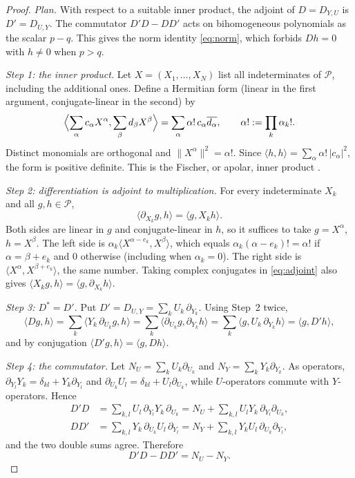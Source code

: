 \documentclass[11pt]{article}
\theoremstyle{remark}
\newcommand{\D}[2]{D_{#1,#2}}
\newcommand{\PP}{\mathcal P}
\begin{document}
\begin{proof}
\emph{Plan.} With respect to a suitable inner product, the adjoint of
$D=\D{Y}{U}$ is $D'=\D{U}{Y}$. The commutator $D'D-DD'$ acts on
bihomogeneous polynomials as the scalar $p-q$. This gives the norm identity
\eqref{eq:norm}, which forbids $Dh=0$ with $h\ne0$ when $p>q$.

\emph{Step 1: the inner product.} Let $X=(X_1,\dots,X_N)$ list all
indeterminates of $\PP$, including the additional ones. Define a Hermitian
form (linear in the first argument, conjugate-linear in the second) by
\begin{equation}\label{eq:fischer}
 \Bigl\langle\sum_\alpha c_\alpha X^\alpha,\sum_\beta d_\beta X^\beta
 \Bigr\rangle=\sum_\alpha\alpha!\,c_\alpha\overline{d_\alpha},
 \qquad\alpha!:=\prod_k\alpha_k!.
\end{equation}
Distinct monomials are orthogonal and $\|X^\alpha\|^2=\alpha!$. Since
$\langle h,h\rangle=\sum_\alpha\alpha!\,|c_\alpha|^2$, the form is positive
definite. This is the Fischer, or apolar, inner product
\cite[Section~2, equation~(8) and Proposition~3]{AldazRender}.

\emph{Step 2: differentiation is adjoint to multiplication.} For every
indeterminate $X_k$ and all $g,h\in\PP$,
\begin{equation}\label{eq:adjoint}
 \langle\partial_{X_k}g,h\rangle=\langle g,X_kh\rangle .
\end{equation}
Both sides are linear in $g$ and conjugate-linear in $h$, so it suffices to
take $g=X^\alpha$, $h=X^\beta$. The left side is
$\alpha_k\langle X^{\alpha-e_k},X^\beta\rangle$, which equals
$\alpha_k(\alpha-e_k)!=\alpha!$ if $\alpha=\beta+e_k$ and $0$ otherwise
(including when $\alpha_k=0$). The right side is
$\langle X^\alpha,X^{\beta+e_k}\rangle$, the same number. Taking complex
conjugates in \eqref{eq:adjoint} also gives
$\langle X_kg,h\rangle=\langle g,\partial_{X_k}h\rangle$.

\emph{Step 3: $D^*=D'$.} Put $D'=\D{U}{Y}=\sum_kU_k\,\partial_{Y_k}$.
Using Step~2 twice,
\[
 \langle Dg,h\rangle
 =\sum_k\langle Y_k\,\partial_{U_k}g,h\rangle
 =\sum_k\langle\partial_{U_k}g,\partial_{Y_k}h\rangle
 =\sum_k\langle g,U_k\,\partial_{Y_k}h\rangle
 =\langle g,D'h\rangle,
\]
and by conjugation $\langle D'g,h\rangle=\langle g,Dh\rangle$.

\emph{Step 4: the commutator.} Let
$N_U=\sum_k U_k\partial_{U_k}$ and $N_Y=\sum_k Y_k\partial_{Y_k}$. As
operators, $\partial_{Y_l}Y_k=\delta_{kl}+Y_k\partial_{Y_l}$ and
$\partial_{U_k}U_l=\delta_{kl}+U_l\partial_{U_k}$, while $U$-operators
commute with $Y$-operators. Hence
\begin{align*}
 D'D&=\sum_{k,l}U_l\,\partial_{Y_l}Y_k\,\partial_{U_k}
    =N_U+\sum_{k,l}U_lY_k\,\partial_{Y_l}\partial_{U_k},\\
 DD'&=\sum_{k,l}Y_k\,\partial_{U_k}U_l\,\partial_{Y_l}
    =N_Y+\sum_{k,l}Y_kU_l\,\partial_{U_k}\partial_{Y_l},
\end{align*}
and the two double sums agree. Therefore
\begin{equation}\label{eq:comm}
 D'D-DD'=N_U-N_Y .
\end{equation}


\end{proof}
\end{document}
